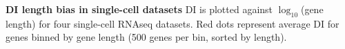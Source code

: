 \textbf{DI length bias in single-cell datasets} DI is plotted against $\log_{10}$(gene length) for four single-cell RNAseq datasets. Red dots represent average DI for genes binned by gene length (500 genes per bin, sorted by length).


